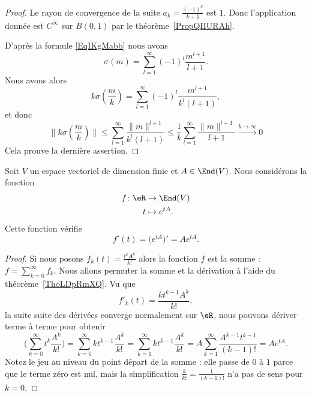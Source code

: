 \begin{proof}

	Le rayon de convergence de la suite \( a_k=\frac{ (-1)^k }{ k+1 }\) est \( 1\). Donc l'application donnée est \(  C^{\infty}\) sur \( B(0,1)\) par le théorème~\ref{PropQIIURAh}.

	D'après la formule \eqref{EqIKgMabb} nous avons
	\begin{equation}
		\sigma(m)=\sum_{l=1}^{\infty}(-1)^l\frac{ m^{l+1} }{ l+1 }.
	\end{equation}
	Nous avons alors
	\begin{equation}
		k\sigma(\frac{ m }{ k })=\sum_{l=1}^{\infty}(-1)^l\frac{ m^{l+1} }{ k^l(l+1) },
	\end{equation}
	et donc
	\begin{equation}
		\| k\sigma(\frac{ m }{ k }) \|\leq \sum_{l=1}^{\infty}\frac{ \| m \|^{l+1} }{ k^l(l+1) }\leq\frac{1}{ k }\sum_{l=1}^{\infty}\frac{ \| m \|^{l+1} }{ l+1 }\stackrel{k\to\infty}{\to} 0
	\end{equation}
	Cela prouve la dernière assertion.
\end{proof}

\begin{proposition}
	Soit \( V\) un espace vectoriel de dimension finie et \( A\in\End(V)\). Nous considérons la fonction
	\begin{equation}
		\begin{aligned}
			f\colon \eR & \to \End(V)      \\
			t           & \mapsto  e^{tA}.
		\end{aligned}
	\end{equation}
	Cette fonction vérifie
	\begin{equation}
		f'(t)=\big(  e^{tA} \big)'=A e^{tA}.
	\end{equation}
\end{proposition}

\begin{proof}
	Si nous posons \( f_k(t)=\frac{ t^kA^k }{ k! }\) alors la fonction \( f\) est la somme : \( f=\sum_{k=0}^{\infty}f_k\). Nous allons permuter la somme et la dérivation à l'aide du théorème~\ref{ThoLDpRmXQ}. Vu que
	\begin{equation}
		f'_k(t)=\frac{ kt^{k-1}A^k }{ k! },
	\end{equation}
	la suite suite des dérivées converge normalement sur \( \eR\), nous pouvons dériver terme à terme pour obtenir
	\begin{equation}
		\Big( \sum_{k=0}^{\infty}t^k\frac{ A^k }{ k! } \Big)=\sum_{k=0}^{\infty}kt^{k-1}\frac{ A^k }{ k! }=\sum_{k=1}^{\infty}kt^{k-1}\frac{ A^k }{ k! }=A\sum_{k=1}^{\infty}\frac{ A^{k-1}t^{k-1} }{ (k-1)! }=A e^{tA}.
	\end{equation}
	Notez le jeu au niveau du point départ de la somme : elle passe de \( 0\) à \( 1\) parce que le terme zéro est nul, mais la simplification \( \frac{ k }{ k! }=\frac{ 1 }{ (k-1)! }\) n'a pas de sens pour \( k=0\).
\end{proof}

